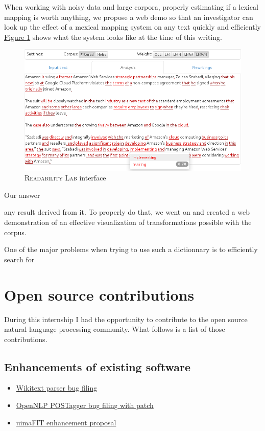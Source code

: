 \documentclass[a4paper, 11pt, onepage]{scrreprt}
\newcommand\figureref[1]{\hyperref[#1]{Figure \ref*{#1}}}
\begin{document}
When working with noisy data and large corpora, properly estimating if
a lexical mapping is worth anything, we propose a web demo so that an
investigator can look up the effect of a mexical mapping system on any
text quickly and efficiently \figureref{fig:ui} shows what the system
looks like at the time of this writing.

\begin{figure}[H]
  \centering
  \includegraphics[width=\textwidth]{ui}
  \caption{\textsc{Readability Lab} interface}
  \label{fig:ui}
\end{figure}

Our answer

 any result derived from it. To properly do that, we
went on and created a web demonstration of an effective visualization
of transformations possible with the corpus.

One of the major problems when trying to use such a dictionnary is to
efficiently search for 

\chapter{Open source contributions}
\label{cha:oss-contribs}

During this internship I had the opportunity to contribute to the open
source natural language processing community. What follows is a list
of those contributions.

\section{Enhancements of existing software}
\label{sec:enhancements}

\begin{itemize}
\item
  \href{https://bugs.eclipse.org/bugs/show_bug.cgi?id=433163}{Wikitext
    parser bug filing}
\item \href{https://issues.apache.org/jira/browse/OPENNLP-676}{OpenNLP
    POSTagger bug filing with patch}
\item \href{https://issues.apache.org/jira/browse/UIMA-3913}{uimaFIT
    enhancement proposal}
\end{itemize}
\end{document}
